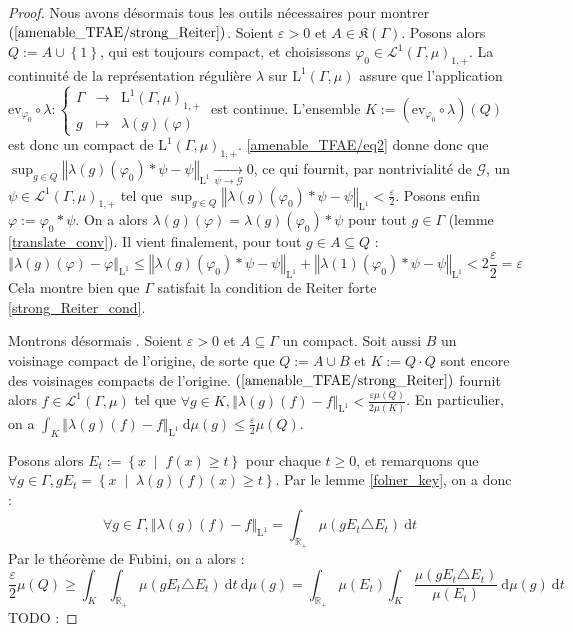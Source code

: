 \documentclass[a4paper,12pt]{article}
\newcommand{\R}{\mathbb{R}}
\newcommand{\ev}{\mathrm{ev}}
\newcommand{\norm}[1]{\left\Vert #1\right\Vert}
\newcommand{\halfilon}{{\frac\varepsilon2}}
\newcommand{\set}[1]{\left\{ #1 \right\}}
\newcommand{\integral}[4]{\int_{#1}^{#2} #3~\mathrm{d}#4}
\newcommand\fundef[3]{#1: \left\{\begin{array}{ccc}#2\\#3\end{array}\right.}
\newcommand{\tq}{\;\middle|\;}
\newcommand{\comp}{\circ}
\renewcommand{\implies}{\Rightarrow}
\newcommand{\TODO}[1]{{\color{red}TODO :} #1}
\begin{document}
\begin{proof}
    Nous avons désormais tous les outils nécessaires pour montrer $(\ref{amenable_TFAE/strong_Reiter})$. Soient $\varepsilon>0$ et $A\in\mathfrak{K}(\Gamma)$.
    Posons alors $Q := A\cup\set{1}$, qui est toujours compact, et choisissons $\varphi_0\in\mathscr{L}^1(\Gamma, \mu)_{1, +}$. La continuité de la représentation régulière $\lambda$ sur 
    $\mathrm{L}^1(\Gamma, \mu)$ assure que l'application $\fundef{\ev_{\varphi_0}\comp\lambda}{\Gamma&\to&\mathrm{L}^1(\Gamma, \mu)_{1, +}}{g&\mapsto&\lambda(g)(\varphi)}$ est continue. 
    L'ensemble $K := (\ev_{\varphi_0}\comp\lambda)(Q)$ est donc un compact de $\mathrm{L}^1(\Gamma, \mu)_{1, +}$. \eqref{amenable_TFAE/eq2} donne donc 
    que $\sup_{g\in Q}\norm{\lambda(g)(\varphi_0)\ast\psi - \psi}_{\mathrm{L}^1} \xrightarrow[\psi\to\mathscr{G}]{} 0$, ce qui fournit, par nontrivialité 
    de $\mathscr{G}$, un $\psi\in\mathscr{L}^1(\Gamma, \mu)_{1, +}$ tel que $\sup_{g\in Q}\norm{\lambda(g)(\varphi_0)\ast\psi - \psi}_{\mathrm{L}^1} < \halfilon$. Posons enfin $\varphi := \varphi_0\ast\psi$.
    On a alors $\lambda(g)(\varphi) = \lambda(g)(\varphi_0)\ast\psi$ pour tout $g\in\Gamma$ (lemme \ref{translate_conv}). Il vient finalement, pour tout $g\in A\subseteq Q$ : 
    \begin{equation*}
        \norm{\lambda(g)(\varphi) - \varphi}_{\mathrm{L}^1} \leq    
            \norm{\lambda(g)(\varphi_0)\ast\psi - \psi}_{\mathrm{L}^1} + \norm{\lambda(1)(\varphi_0)\ast\psi - \psi}_{\mathrm{L}^1}
            < 2\halfilon = \varepsilon
    \end{equation*}
    Cela montre bien que $\Gamma$ satisfait la condition de Reiter forte \eqref{strong_Reiter_cond}.

    Montrons désormais \framebox{$(\ref{amenable_TFAE/strong_Reiter})\implies(\ref{amenable_TFAE/strong_Folner})$}. Soient $\varepsilon>0$
    et $A\subseteq\Gamma$ un compact. Soit aussi $B$ un voisinage compact de l'origine, de sorte que $Q := A\cup B$ et $K := Q\cdot Q$ sont encore des voisinages compacts de l'origine.
    $(\ref{amenable_TFAE/strong_Reiter})$ fournit alors $f\in\mathscr{L}^1(\Gamma, \mu)$ tel que $\forall g\in K, \norm{\lambda(g)(f) - f}_{\mathrm{L}^1} < \frac{\varepsilon\mu(Q)}{2\mu(K)}$.
    En particulier, on a $\integral{K}{}{\norm{\lambda(g)(f) - f}_{\mathrm{L}^1}}{\mu(g)} \leq \halfilon\mu(Q)$.

    Posons alors $E_t := \set{x\tq f(x)\geq t}$ pour chaque $t\geq0$, et remarquons que 
    $\forall g\in\Gamma, gE_t = \set{x\tq \lambda(g)(f)(x) \geq t}$. Par le lemme \ref{folner_key}, on a donc :
    \begin{equation*}
        \forall g\in\Gamma, \norm{\lambda(g)(f) - f}_{\mathrm{L}^1} = \integral{\R_+}{}{\mu(gE_t\triangle E_t)}{t}
    \end{equation*}
    Par le théorème de Fubini, on a alors :
    \begin{equation*}
        \halfilon\mu(Q) \geq \integral{K}{}{\integral{\R_+}{}{\mu(gE_t\triangle E_t)}{t}}{\mu(g)} = \integral{\R_+}{}{\mu(E_t)\integral{K}{}{\frac{\mu(gE_t\triangle E_t)}{\mu(E_t)}}{\mu(g)}}{t}
    \end{equation*}
    \TODO{}


\end{proof}
\end{document}
